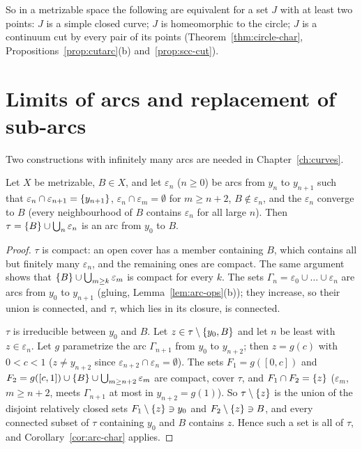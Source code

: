 So in a metrizable space the following are equivalent for a set $J$ with at least two points:
$J$ is a simple closed curve; $J$ is homeomorphic to the circle; $J$ is a continuum cut by every
pair of its points (Theorem~\ref{thm:circle-char}, Propositions~\ref{prop:cutarc}(b)
and~\ref{prop:scc-cut}).

\section{Limits of arcs and replacement of sub-arcs}

Two constructions with infinitely many arcs are needed in Chapter~\ref{ch:curves}.

\begin{theorem}\label{thm:limit-arc}
Let $X$ be metrizable, $B\in X$, and let $\varepsilon_n$ ($n\ge0$) be arcs from $y_n$ to $y_{n+1}$
such that $\varepsilon_n\cap\varepsilon_{n+1}=\left\{ y_{n+1} \right\}$, $\varepsilon_n\cap\varepsilon_m=\emptyset$
for $m\ge n+2$, $B\notin\varepsilon_n$, and the $\varepsilon_n$ converge to $B$ (every
neighbourhood of $B$ contains $\varepsilon_n$ for all large $n$). Then
$\tau=\left\{ B \right\}\cup\bigcup_n\varepsilon_n$ is an arc from $y_0$ to $B$.
\end{theorem}

\begin{proof}
$\tau$ is compact: an open cover has a member containing $B$, which contains all but finitely many
$\varepsilon_n$, and the remaining ones are compact. The same argument shows that
$\left\{ B \right\}\cup\bigcup_{m\ge k}\varepsilon_m$ is compact for every $k$. The sets
$\Gamma_n=\varepsilon_0\cup\dots\cup\varepsilon_n$ are arcs from $y_0$ to $y_{n+1}$ (gluing,
Lemma~\ref{lem:arc-ops}(b)); they increase, so their union is connected, and $\tau$, which lies in its
closure, is connected.

$\tau$ is irreducible between $y_0$ and $B$. Let $z\in\tau\setminus\left\{ y_0,B \right\}$ and let $n$ be least
with $z\in\varepsilon_n$. Let $g$ parametrize the arc $\Gamma_{n+1}$ from $y_0$ to $y_{n+2}$; then
$z=g(c)$ with $0<c<1$ ($z\ne y_{n+2}$ since $\varepsilon_{n+2}\cap\varepsilon_n=\emptyset$). The sets
$F_1=g([0,c])$ and $F_2=g([c,1])\cup\left\{ B \right\}\cup\bigcup_{m\ge n+2}\varepsilon_m$ are compact, cover
$\tau$, and $F_1\cap F_2=\left\{ z \right\}$ ($\varepsilon_m$, $m\ge n+2$, meets $\Gamma_{n+1}$ at most in
$y_{n+2}=g(1)$). So $\tau\setminus\left\{ z \right\}$ is the union of the disjoint relatively closed sets
$F_1\setminus\left\{ z \right\}\ni y_0$ and $F_2\setminus\left\{ z \right\}\ni B$, and every connected subset of $\tau$
containing $y_0$ and $B$ contains $z$. Hence such a set is all of $\tau$, and
Corollary~\ref{cor:arc-char} applies.
\end{proof}

